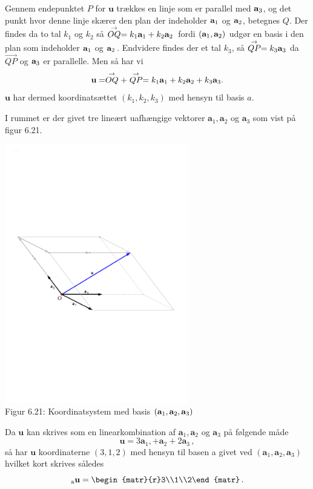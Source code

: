 Gennem endepunktet $P$ for $\mathbf u$ trækkes en linje som er parallel med $\mathbf{a}_3$, og det punkt hvor denne linje skærer den plan der indeholder $\mathbf{a}_1$ og $\mathbf{a}_2$, betegnes $Q$. Der findes da to tal $k_1$ og $k_2$ så $\stackrel{\rightarrow}{OQ}=k_1\mathbf{a}_1+k_2\mathbf{a}_2\,$ fordi $(\mathbf{a}_1,\mathbf{a}_2)$ udgør en basis i den plan som indeholder $\mathbf{a}_1$ og $\mathbf{a}_2\,$. Endvidere findes der et tal  $k_3$, så $\stackrel{\rightarrow}{QP}=k_3\mathbf{a}_3$ da $\stackrel{\rightarrow}{QP}$ og $\mathbf{a}_3$ er parallelle. Men så har vi
$$\mathbf u=\stackrel{\rightarrow}{OQ}+\stackrel{\rightarrow}{QP}=k_1\mathbf{a}_1+k_2\mathbf{a}_2+k_3\mathbf{a}_3.
$$
$\mathbf u$ har dermed koordinatsættet $(k_1,k_2,k_3)$ med hensyn til basis $a$. 
\begin{example}\label{koordValgtBasis}
I rummet er der givet tre lineært uafhængige vektorer $\mathbf a_1,\mathbf a_2$ og $\mathbf a_3$ som vist på figur 6.21.
\begin{center}
		\includegraphics[trim=1cm 10cm 1cm 10cm,width=0.60\textwidth,clip]{geometer/abasis01b.pdf}				
		\\Figur 6.21: Koordinatsystem med basis $(\mathbf{a}_1,\mathbf{a}_2,\mathbf{a}_3)$
\end{center}
Da $\mathbf u$ kan skrives som en linearkombination af $\mathbf a_1,\mathbf a_2$ og $\mathbf a_3$ på følgende måde
\begin{equation}
\mathbf u=3\mathbf a_1,+\mathbf a_2+2\mathbf a_3\,,
\end{equation}
så har $\mathbf u $ koordinaterne $(3,1,2)$ med hensyn til basen a givet ved $(\mathbf a_1,\mathbf a_2,\mathbf a_3)$ hvilket kort skrives således
\begin{equation}
 _\mathrm a\mathbf u=
\begin{matr}{r}3\\1\\2\end{matr}\,.
\end{equation}
\end{example}

